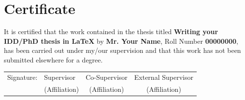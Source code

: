 \chapter*{\vspace{-3cm} \centering \Large Certificate}

It is certified that the work contained in the thesis titled \textbf{Writing your IDD/PhD thesis in \texorpdfstring{\LaTeX}{LaTeX}} by \textbf{Mr. Your Name}, Roll Number \textbf{00000000}, has been carried out under my/our supervision and that this work has not been submitted elsewhere for a degree. \\





\vspace*{3cm}
\begin{table}[htbp]
	{ \bfseries
	\begin{tabular}{llcc}
		Signature: \hspace{0.5cm} & Supervisor            \hspace{1cm}        & Co-Supervisor   \hspace{1cm}  &  External Supervisor   \\
		 \hspace{0.5cm}  & (Affiliation)             \hspace{1cm}       &  (Affiliation)        \hspace{1cm}       &  (Affiliation)     
	\end{tabular} 
}
\end{table}
